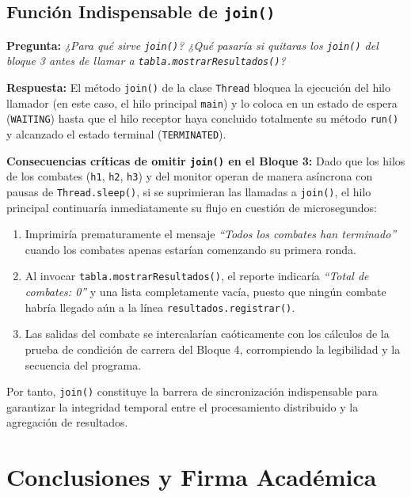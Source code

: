 \documentclass[11pt,letterpaper]{article}
\begin{document}
\subsection{Función Indispensable de \texttt{join()}}
\textbf{Pregunta:} \textit{¿Para qué sirve \texttt{join()}? ¿Qué pasaría si quitaras los \texttt{join()} del bloque 3 antes de llamar a \texttt{tabla.mostrarResultados()}?}

\vspace{0.2cm}
\noindent \textbf{Respuesta:}
El método \texttt{join()} de la clase \texttt{Thread} bloquea la ejecución del hilo llamador (en este caso, el hilo principal \texttt{main}) y lo coloca en un estado de espera (\texttt{WAITING}) hasta que el hilo receptor haya concluido totalmente su método \texttt{run()} y alcanzado el estado terminal (\texttt{TERMINATED}).

\textbf{Consecuencias críticas de omitir \texttt{join()} en el Bloque 3:}
Dado que los hilos de los combates (\texttt{h1}, \texttt{h2}, \texttt{h3}) y del monitor operan de manera asíncrona con pausas de \texttt{Thread.sleep()}, si se suprimieran las llamadas a \texttt{join()}, el hilo principal continuaría inmediatamente su flujo en cuestión de microsegundos:
\begin{enumerate}
    \item Imprimiría prematuramente el mensaje \textit{``Todos los combates han terminado''} cuando los combates apenas estarían comenzando su primera ronda.
    \item Al invocar \texttt{tabla.mostrarResultados()}, el reporte indicaría \textit{``Total de combates: 0''} y una lista completamente vacía, puesto que ningún combate habría llegado aún a la línea \texttt{resultados.registrar()}.
    \item Las salidas del combate se intercalarían caóticamente con los cálculos de la prueba de condición de carrera del Bloque 4, corrompiendo la legibilidad y la secuencia del programa.
\end{enumerate}
Por tanto, \texttt{join()} constituye la barrera de sincronización indispensable para garantizar la integridad temporal entre el procesamiento distribuido y la agregación de resultados.

\section{Conclusiones y Firma Académica}
\end{document}
